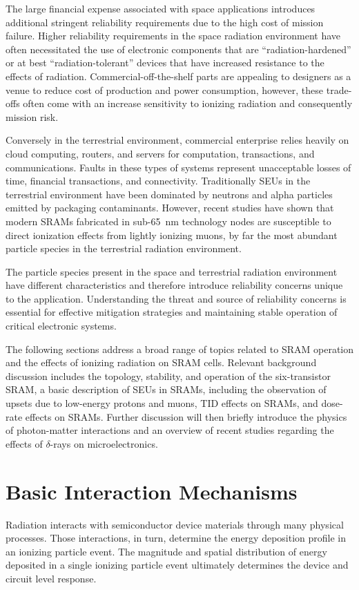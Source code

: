 The large financial expense associated with space applications introduces additional stringent reliability requirements due to the high cost of mission failure.
Higher reliability requirements in the space radiation environment have often necessitated the use of electronic components that are ``radiation-hardened'' or at best ``radiation-tolerant'' devices that have increased resistance to the effects of radiation.
Commercial-off-the-shelf parts are appealing to designers as a venue to reduce cost of production and power consumption, however, these trade-offs often come with an increase sensitivity to ionizing radiation and consequently mission risk.

Conversely in the terrestrial environment, commercial enterprise relies heavily on cloud computing, routers, and servers for computation, transactions, and communications. 
Faults in these types of systems represent unacceptable losses of time, financial transactions, and connectivity. 
Traditionally SEUs in the terrestrial environment have been dominated by neutrons and alpha particles emitted by packaging contaminants.
However, recent studies have shown that modern SRAMs fabricated in sub-65~nm technology nodes are susceptible to direct ionization effects from lightly ionizing muons, by far the most abundant particle species in the terrestrial radiation environment.

The particle species present in the space and terrestrial radiation environment have different characteristics and therefore introduce reliability concerns unique to the application.
Understanding the threat and source of reliability concerns is essential for effective mitigation strategies and maintaining stable operation of critical electronic systems.

The following sections address a broad range of topics related to SRAM operation and the effects of ionizing radiation on SRAM cells. 
Relevant background discussion includes the topology, stability, and operation of the six-transistor SRAM, a basic description of SEUs in SRAMs, including the observation of upsets due to low-energy protons and muons, TID effects on SRAMs, and dose-rate effects on SRAMs.
Further discussion will then briefly introduce the physics of photon-matter interactions and an overview of recent studies regarding the effects of $\delta$-rays on microelectronics.

\section{Basic Interaction Mechanisms} %
\label{sec:basic_interaction_mechanisms}
Radiation interacts with semiconductor device materials through many physical processes.
Those interactions, in turn, determine the energy deposition profile in an ionizing particle event.
The magnitude and spatial distribution of energy deposited in a single ionizing particle event ultimately determines the device and circuit level response.

